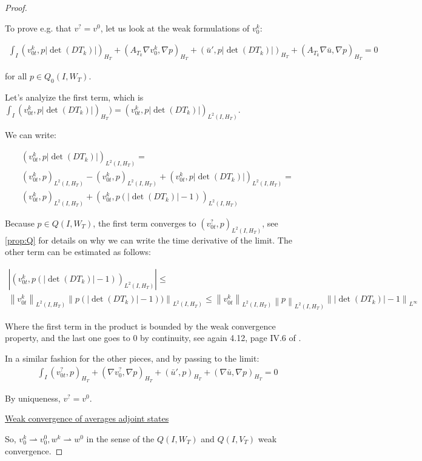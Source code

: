 \documentclass[english,a4paper,12pt,oneside]{scrbook}
\theoremstyle{break}
\newenvironment{mproof}[1][\proofname]{%
  \begin{proof}[#1]$ $\par\nobreak\ignorespaces
}{%
  \end{proof}
}
\renewcommand*{\proofname}{Proof}
\theoremstyle{remark}
\newcommand{\norm}[1]{\left\lVert#1\right\rVert}
\newcommand{\weakc}{\rightharpoonup}
\begin{document}
\begin{mproof}
To prove e.g. that $v^?=v^0$, let us look at the weak formulations of $v_0^k$:

\begin{align*}
\int_I (v_{0t}^k,p |\det(DT_k)|)_{H_T} + (A_{T_k} \nabla v_0^k, \nabla p)_{H_T}+(\bar{u}',p|\det(DT_k)|)_{H_T}+(A_{T_k} \nabla \bar{u} , \nabla p)_{H_T} = 0
\end{align*}

for all $p \in Q_0(I,W_{T})$.

Let's analyize the first term, which is $\int_I (v_{0t}^k,p |\det(DT_k)|)_{H_T} ) =(v_{0t}^k,p |\det(DT_k)|)_{L^2(I,H_T)}$.

We can write:

\begin{align*}
(v_{0t}^k,p |\det(DT_k)|)_{L^2(I,H_T)} =\\ (v_{0t}^k,p )_{L^2(I,H_T)}- (v_{0t}^k,p )_{L^2(I,H_T)} + (v_{0t}^k,p |\det(DT_k)|)_{L^2(I,H_T)} =\\ (v_{0t}^k,p )_{L^2(I,H_T)} + (v_{0t}^k,p (|\det(DT_k)|-1))_{L^2(I,H_T)}
\end{align*}

Because $p \in  Q(I,W_{T})$, the first term converges to $(v_{0t}^?,p )_{L^2(I,H_T)}$, see \cref{prop:Q} for details on why we can write the time derivative of the limit. The other term can be estimated as follows:

\begin{align*}
|(v_{0t}^k,p (|\det(DT_k)|-1))_{L^2(I,H_T)}|\leq\\\norm{v_{0t}^k}_{L^2(I,H_T)}\norm{p (|\det(DT_k)|-1))}_{L^2(I,H_T)}\leq\norm{v_{0t}^k}_{L^2(I,H_T)}\norm{p }_{L^2(I,H_T)} \norm{|\det(DT_k)|-1}_{L^\infty}
\end{align*}

Where the first term in the product is bounded by the weak convergence property, and the last one goes to $0$ by continuity, see again 4.12, page IV.6 of \cite{murat}.

In a similar fashion for the other pieces, and by passing to the limit:
\begin{align*}
\int_I (v_{0t}^?,p)_{H_T} + (\nabla v_0^?, \nabla p)_{H_T}+(\bar{u}',p)_{H_T}+(\nabla \bar{u} , \nabla p)_{H_T} = 0
\end{align*}

By uniqueness, $v^?=v^0$.

\underline{Weak convergence of averages adjoint states}

So, $v_0^k \weakc v_0^0, w^k\weakc w^0$ in the sense of the $Q(I,W_T)$ and $Q(I,V_T)$ weak convergence.


\end{mproof}
\end{document}
